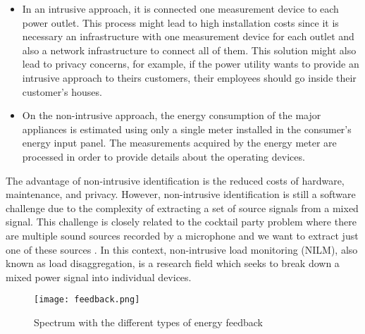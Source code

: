 \begin{itemize}
\item In an intrusive approach, it is connected one measurement device to each power outlet. This process might lead to high installation costs since it is necessary an infrastructure with one measurement device for each outlet and also a network infrastructure to connect all of them. This solution might also lead to privacy concerns, for example, if the power utility wants to provide an intrusive approach to theirs customers, their employees should go inside their customer's houses. 
\item On the non-intrusive approach, the energy consumption of the major appliances is estimated using only a single meter installed in the consumer’s energy input panel. The measurements acquired by the energy meter are processed in order to provide details about the operating devices.
\end{itemize}

The advantage of non-intrusive identification is the reduced costs of hardware, maintenance, and privacy. However, non-intrusive identification is still a software challenge due to the complexity of extracting a set of source signals from a mixed signal. This challenge is closely related to the cocktail party problem where there are multiple sound sources recorded by a microphone and we want to extract just one of these sources \cite{ica}. In this context, non-intrusive load monitoring (NILM), also known as load disaggregation, is a research field which seeks to break down a mixed power signal into individual devices.

\begin{figure}[tb]
    \centering
    \texttt{[image: feedback.png]}
    \caption{Spectrum with the different types of energy feedback \cite{epri}}
    \label{feedback}
\end{figure}

